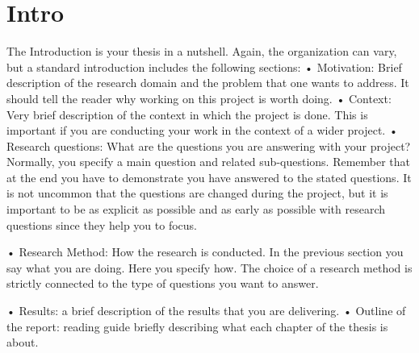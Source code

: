 \section{Intro}
The Introduction is your thesis in a nutshell. 
Again, the organization can vary, but a
standard introduction includes the following sections:
• Motivation: Brief description of the research domain and the problem that one
wants to address. It should tell the reader why working on this project is worth
doing.
• Context: Very brief description of the context in which the project is done. This
is important if you are conducting your work in the context of a wider project.
• Research questions: What are the questions you are answering with your
project? Normally, you specify a main question and related sub-questions.
Remember that at the end you have to demonstrate you have answered to the
stated questions. It is not uncommon that the questions are changed during the
project, but it is important to be as explicit as possible and as early as possible
with research questions since they help you to focus.

• Research Method: How the research is conducted. In the previous section you
say what you are doing. Here you specify how. The choice of a research method
is strictly connected to the type of questions you want to answer.

• Results: a brief description of the results that you are delivering.
• Outline of the report: reading guide briefly describing what each chapter of the
thesis is about.